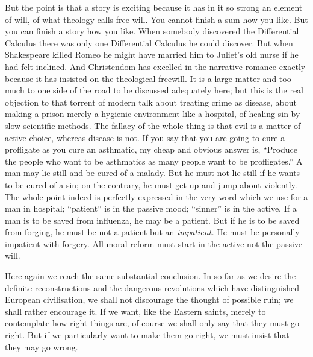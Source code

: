 \documentclass{book}
\begin{document}
But the point is that a story is exciting because it has in it so strong an element of will, of what theology calls free-will. You cannot finish a sum how you like. But you can finish a story how you like. When somebody discovered the Differential Calculus there was only one Differential Calculus he could discover. But when Shakespeare killed Romeo he might have married him to Juliet’s old nurse if he had felt inclined. And Christendom has excelled in the narrative romance exactly because it has insisted on the theological freewill. It is a large matter and too much to one side of the road to be discussed adequately here; but this is the real objection to that torrent of modern talk about treating crime as disease, about making a prison merely a hygienic environment like a hospital, of healing sin by slow scientific methods. The fallacy of the whole thing is that evil is a matter of active choice, whereas disease is not. If you say that you are going to cure a profligate as you cure an asthmatic, my cheap and obvious answer is, “Produce the people who want to be asthmatics as many people want to be profligates.” A man may lie still and be cured of a malady. But he must not lie still if he wants to be cured of a sin; on the contrary, he must get up and jump about violently. The whole point indeed is perfectly expressed in the very word which we use for a man in hospital; “patient” is in the passive mood; “sinner” is in the active. If a man is to be saved from influenza, he may be a patient. But if he is to be saved from forging, he must be not a patient but an \emph{impatient.} He must be personally impatient with forgery. All moral reform must start in the active not the passive will.

Here again we reach the same substantial conclusion. In so far as we desire the definite reconstructions and the dangerous revolutions which have distinguished European civilisation, we shall not discourage the thought of possible ruin; we shall rather encourage it. If we want, like the Eastern saints, merely to contemplate how right things are, of course we shall only say that they must go right. But if we particularly want to make them go right, we must insist that they may go wrong.
\end{document}
